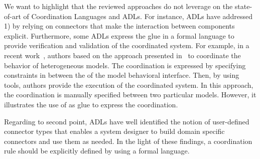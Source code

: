 We want to highlight that the reviewed approaches do not leverage on the state-of-art of Coordination Languages and ADLs. For instance, ADLs have addressed 1) by relying on connectors that make the interaction between components explicit. Furthermore, some ADLs express the glue in a formal language to provide verification and validation of the coordinated system. For example, in a recent work~\cite{varagemoc13bib}, authors based on the approach presented in~\cite{sle13-combemale} to coordinate the behavior of heterogeneous models. The coordination is expressed by specifying constraints in \ccsl between the \mse of the model behavioral interface. Then, by using \ccsl tools, authors provide the execution of the coordinated system. In this approach, the coordination is manually specified between two particular models. However, it illustrates the use of \ccsl as glue to express the coordination.  
		
Regarding to second point, ADLs have well identified the notion of user-defined connector types that enables a system designer to build domain specific connectors and use them as needed. In the light of these findings, a coordination rule should be explicitly defined by using a formal language.
     
		
	 	
 		 		
 		
 		
 		
